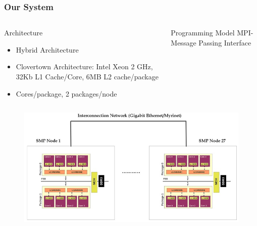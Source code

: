 \documentclass{beamer}
\begin{document}
\begin{frame}
\frametitle{Our System}

\begin{columns}[c]

\begin{block}{Architecture}
\begin{itemize}
\item {\fontsize{6}{4}\selectfont Hybrid Architecture}
\item {\fontsize{6}{4}\selectfont Clovertown Architecture: Intel Xeon 2 GHz, 32Kb L1 Cache/Core, 6MB L2 cache/package}
\item {\fontsize{6}{4} Cores/package, 2 packages/node}
\end{itemize}
\end{block}
\begin{block}{Programming Model}
MPI- Message Passing Interface
\end{block}

\end{columns}

\begin{figure}
\includegraphics[width=.8\linewidth,height=\textheight,keepaspectratio]{system.jpg}
\end{figure}

\end{frame}
\end{document}

